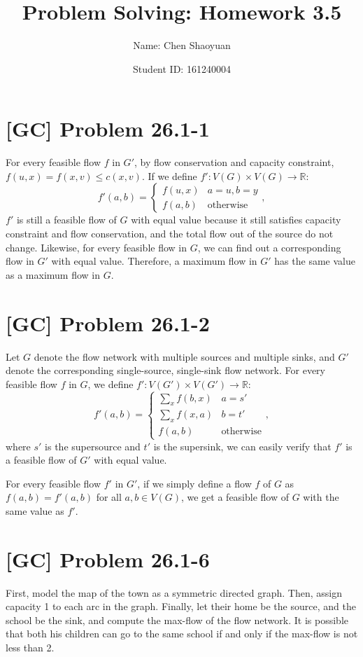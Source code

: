 \documentclass[a4paper,11pt,twocolumn]{article}
\newcommand{\homeworkno}{3.5}
\begin{document}
  \title{Problem Solving: Homework \homeworkno}
  \author{Name: Chen Shaoyuan \and Student ID: 161240004}
  \maketitle

  \section{[GC] Problem 26.1-1}
  For every feasible flow $f$ in $G'$, by flow conservation and capacity constraint, $f(u, x) = f(x, v) \leq c(x, v)$. If we define $f': V(G) \times V(G) \rightarrow \mathbb{R}$:
  $$ f'(a, b) = \begin{cases} f(u, x) & a = u, b = y \\ f(a, b) & \text{otherwise} \end{cases}, $$
  $f'$ is still a feasible flow of $G$ with equal value because it still satisfies capacity constraint and flow conservation, and the total flow out of the source do not change. Likewise, for every feasible flow in $G$, we can find out a corresponding flow in $G'$ with equal value. Therefore, a maximum flow in $G'$ has the same value as a maximum flow in $G$.

  \section{[GC] Problem 26.1-2}
  Let $G$ denote the flow network with multiple sources and multiple sinks, and $G'$ denote the corresponding single-source, single-sink flow network. For every feasible flow $f$ in $G$, we define $f': V(G') \times V(G') \rightarrow \mathbb{R}$:
  $$ f'(a, b) = \begin{cases} \sum\limits_{x}f(b, x) & a = s' \\ \sum\limits_{x} f(x, a) & b = t' \\ f(a, b) & \text{otherwise} \end{cases}, $$
  where $s'$ is the supersource and $t'$ is the supersink, we can easily verify that $f'$ is  a feasible flow of $G'$ with equal value. \par
  For every feasible flow $f'$ in $G'$, if we simply define a flow $f$ of $G$ as $f(a, b) = f'(a, b)$ for all $a, b \in V(G)$, we get a feasible flow of $G$ with the same value as $f'$.

  \section{[GC] Problem 26.1-6}
  First, model the map of the town as a symmetric directed graph. Then, assign capacity 1 to each arc in the graph. Finally, let their home be the source, and the school be the sink, and compute the max-flow of the flow network. It is possible that both his children can go to the same school if and only if the max-flow is not less than 2.
\end{document}
